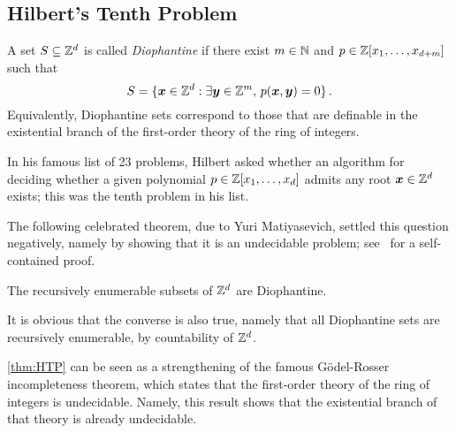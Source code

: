 \subsection{Hilbert's Tenth Problem}

A set $S \subseteq \mathbb{Z}^{d}$ is called \emph{Diophantine} if there exist $m \in \mathbb{N}$ and $p \in \mathbb{Z}[x_{1}, \ldots, x_{d+m}]$ such that
\[ S = \lbrace \boldsymbol{x} \in \mathbb{Z}^{d} : \exists \boldsymbol{y} \in \mathbb{Z}^{m}, \, p(\boldsymbol{x}, \boldsymbol{y}) = 0 \rbrace \, . \]
Equivalently, Diophantine sets correspond to those that are definable in the existential branch of the first-order theory of the ring of integers.

In his famous list of 23 problems, Hilbert asked whether an algorithm for deciding whether a given polynomial $p \in \mathbb{Z}[x_{1}, \ldots, x_{d}]$ admits any root $\boldsymbol{x} \in \mathbb{Z}^{d}$ exists; this was the tenth problem in his list.

The following celebrated theorem, due to Yuri Matiyasevich, settled this question negatively, namely by showing that it is an undecidable problem; see~\cite{HTP} for a self-contained proof.

\begin{theorem}[Matiyasevich]
\label{thm:HTP}
The recursively enumerable subsets of $\mathbb{Z}^{d}$ are Diophantine.
\end{theorem}

It is obvious that the converse is also true, namely that all Diophantine sets are recursively enumerable, by countability of $\mathbb{Z}^{d}$.

\cref{thm:HTP} can be seen as a strengthening of the famous G\"{o}del-Rosser incompleteness theorem, which states that the first-order theory of the ring of integers is undecidable. Namely, this result shows that the existential branch of that theory is already undecidable.
